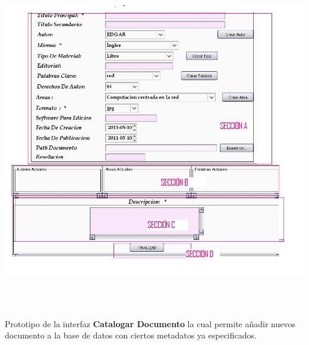 \begin{minipage}{1\textwidth}
	\begin{center}
	\includegraphics[width= 17cm , height= 15cm]{prototiposGui/catalogarDoc}
	\end{center}
	{Prototipo de la interfaz {\bf Catalogar Documento} la cual permite añadir nuevos documento a
	la base de datos con ciertos metadatos ya especificados.}
\end{minipage}

